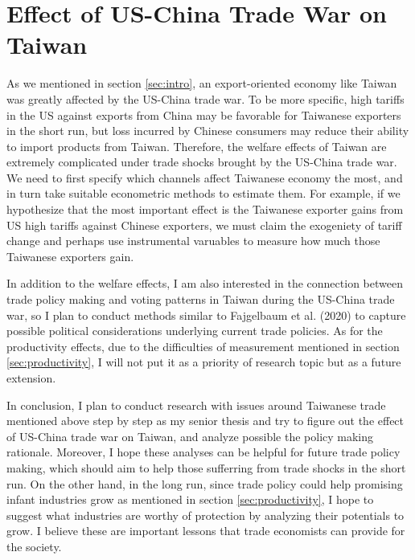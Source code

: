 \documentclass[12pt]{article}
\begin{document}
\section{Effect of US-China Trade War on Taiwan}
\label{sec:Taiwan}
As we mentioned in section \ref{sec:intro}, an export-oriented economy like Taiwan was greatly affected by the US-China trade war.
To be more specific, high tariffs in the US against exports from China may be favorable for Taiwanese exporters in the short run, 
but loss incurred by Chinese consumers may reduce their ability to import products from Taiwan.
Therefore, the welfare effects of Taiwan are extremely complicated under trade shocks brought by the US-China trade war.
We need to first specify which channels affect Taiwanese economy the most, and in turn take suitable econometric methods to estimate them.
For example, if we hypothesize that the most important effect is the Taiwanese exporter gains from US high tariffs against Chinese exporters, 
we must claim the exogeniety of tariff change and perhaps use instrumental varuables to measure how much those Taiwanese exporters gain. 

In addition to the welfare effects, I am also interested in the connection between trade policy making and voting patterns in Taiwan during the US-China trade war, 
so I plan to conduct methods similar to Fajgelbaum et al. (2020) \cite{fajgelbaum2020return} to capture possible political considerations underlying current trade policies.
As for the productivity effects, due to the difficulties of measurement mentioned in section \ref{sec:productivity}, I will not put it as a priority of research topic but as a future extension. 

In conclusion, I plan to conduct research with issues around Taiwanese trade mentioned above step by step as my senior thesis and try to figure out the effect of US-China trade war on Taiwan, 
and analyze possible the policy making rationale. 
Moreover, I hope these analyses can be helpful for future trade policy making, which should aim to help those sufferring from trade shocks in the short run.
On the other hand, in the long run, since trade policy could help promising infant industries grow as mentioned in section \ref{sec:productivity}, 
I hope to suggest what industries are worthy of protection by analyzing their potentials to grow. 
I believe these are important lessons that trade economists can provide for the society.




\end{document}
